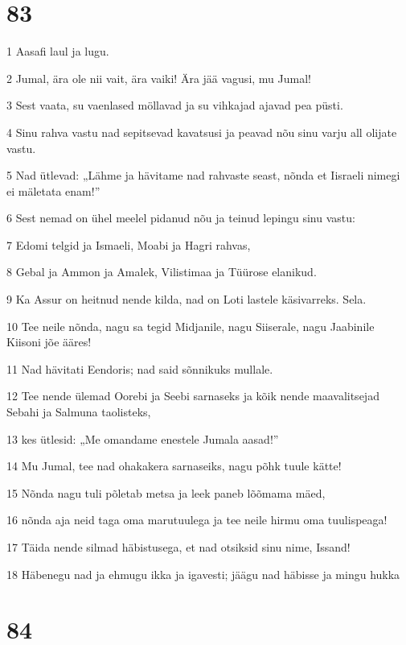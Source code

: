 \chapter{83}

\par 1 Aasafi laul ja lugu.
\par 2 Jumal, ära ole nii vait, ära vaiki! Ära jää vagusi, mu Jumal!
\par 3 Sest vaata, su vaenlased möllavad ja su vihkajad ajavad pea püsti.
\par 4 Sinu rahva vastu nad sepitsevad kavatsusi ja peavad nõu sinu varju all olijate vastu.
\par 5 Nad ütlevad: „Lähme ja hävitame nad rahvaste seast, nõnda et Iisraeli nimegi ei mäletata enam!”
\par 6 Sest nemad on ühel meelel pidanud nõu ja teinud lepingu sinu vastu:
\par 7 Edomi telgid ja Ismaeli, Moabi ja Hagri rahvas,
\par 8 Gebal ja Ammon ja Amalek, Vilistimaa ja Tüürose elanikud.
\par 9 Ka Assur on heitnud nende kilda, nad on Loti lastele käsivarreks. Sela.
\par 10 Tee neile nõnda, nagu sa tegid Midjanile, nagu Siiserale, nagu Jaabinile Kiisoni jõe ääres!
\par 11 Nad hävitati Eendoris; nad said sõnnikuks mullale.
\par 12 Tee nende ülemad Oorebi ja Seebi sarnaseks ja kõik nende maavalitsejad Sebahi ja Salmuna taolisteks,
\par 13 kes ütlesid: „Me omandame enestele Jumala aasad!”
\par 14 Mu Jumal, tee nad ohakakera sarnaseiks, nagu põhk tuule kätte!
\par 15 Nõnda nagu tuli põletab metsa ja leek paneb lõõmama mäed,
\par 16 nõnda aja neid taga oma marutuulega ja tee neile hirmu oma tuulispeaga!
\par 17 Täida nende silmad häbistusega, et nad otsiksid sinu nime, Issand!
\par 18 Häbenegu nad ja ehmugu ikka ja igavesti; jäägu nad häbisse ja mingu hukka

\chapter{84}

